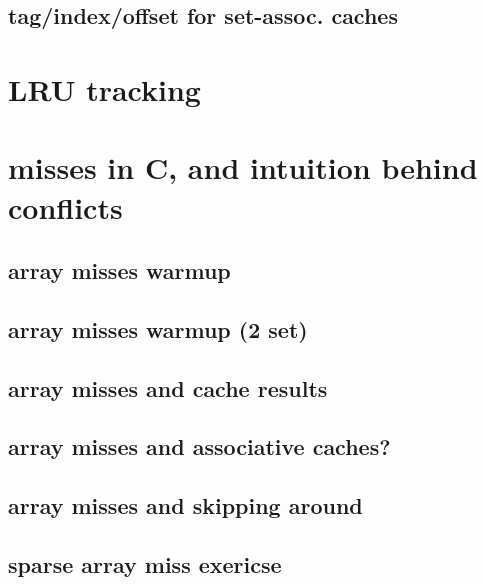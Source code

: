 \subsection{tag/index/offset for set-assoc. caches}


\section{LRU tracking}


\section{misses in C, and intuition behind conflicts}


\subsection{array misses warmup}


\subsection{array misses warmup (2 set)}



\subsection{array misses and cache results}


\subsection{array misses and associative caches?}


\subsection{array misses and skipping around}


\subsection{sparse array miss exericse}


